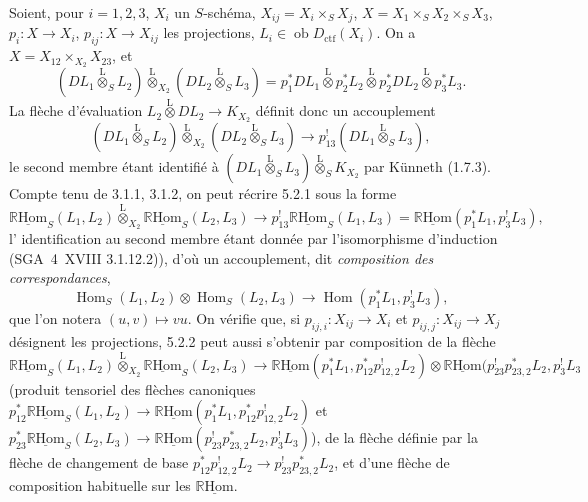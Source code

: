 \documentclass[11pt]{article}
\DeclareMathOperator{\Hom}{Hom}
\newcommand{\R}{\mathbb{R}}\newcommand{\RHomCore}{\mathbb{R}\mathrm{Hom}}
\providecommand{\RHom}{\RHomCore}
\providecommand{\uRHom}{\underline{\RHom}}
\providecommand{\RHom}{\RHomCore}
\providecommand{\Hom}{\operatorname{Hom}}
\providecommand{\RHom}{\R\mathcal{H}om}
\providecommand{\R}{\mathrm R}
\providecommand{\RHom}{\RHomCore}
\providecommand{\Hom}{\operatorname{Hom}}
\begin{document}
Soient, pour $i=1,2,3$, $X_i$ un $S$-schéma, $X_{ij}=X_i\times_SX_j$, $X=X_1\times_SX_2\times_SX_3$, $p_i:X\to X_i$, $p_{ij}:X\to X_{ij}$ les projections, $L_i\in\operatorname{ob}D_{\mathrm{ctf}}(X_i)$. On a $X=X_{12}\times_{X_2}X_{23}$, et
\[
(DL_1\overset{\mathrm{L}}{\otimes}_SL_2)\overset{\mathrm{L}}{\otimes}_{X_2}(DL_2\overset{\mathrm{L}}{\otimes}_SL_3)
=p_1^*DL_1\overset{\mathrm{L}}{\otimes}p_2^*L_2\overset{\mathrm{L}}{\otimes}p_2^*DL_2\overset{\mathrm{L}}{\otimes}p_3^*L_3.
\]
La flèche d'évaluation $L_2\overset{\mathrm{L}}{\otimes}DL_2\to K_{X_2}$ définit donc un accouplement
\begin{equation}
\tag{5.2.1}
(DL_1\overset{\mathrm{L}}{\otimes}_SL_2)\overset{\mathrm{L}}{\otimes}_{X_2}(DL_2\overset{\mathrm{L}}{\otimes}_SL_3)\longrightarrow p_{13}^!(DL_1\overset{\mathrm{L}}{\otimes}_SL_3),
\end{equation}
le second membre étant identifié à $(DL_1\overset{\mathrm{L}}{\otimes}_SL_3)\overset{\mathrm{L}}{\otimes}_SK_{X_2}$ par Künneth (1.7.3). Compte tenu de 3.1.1, 3.1.2, on peut récrire 5.2.1 sous la forme
\begin{equation}
\tag{5.2.2}
\uRHom_S(L_1,L_2)\overset{\mathrm{L}}{\otimes}_{X_2}\uRHom_S(L_2,L_3)\longrightarrow p_{13}^!\uRHom_S(L_1,L_3)=\uRHom(p_1^*L_1,p_3^!L_3),
\end{equation}
l'%
identification au second membre étant donnée par l'isomorphisme d'induction (SGA~4~XVIII 3.1.12.2)), d'où un accouplement, dit \emph{composition des correspondances},
\begin{equation}
\tag{5.2.3}
\Hom_S(L_1,L_2)\otimes\Hom_S(L_2,L_3)\longrightarrow\Hom(p_1^*L_1,p_3^!L_3),
\end{equation}
que l'on notera $(u,v)\mapsto vu$. On vérifie que, si $p_{ij,i}:X_{ij}\to X_i$ et $p_{ij,j}:X_{ij}\to X_j$ désignent les projections, 5.2.2 peut aussi s'obtenir par composition de la flèche
\[
\uRHom_S(L_1,L_2)\overset{\mathrm{L}}{\otimes}_{X_2}\uRHom_S(L_2,L_3)
\longrightarrow
\uRHom(p_1^*L_1,p_{12}^*p_{12,2}^!L_2)
\otimes
\uRHom(p_{23}^!p_{23,2}^*L_2,p_3^!L_3
\]
(produit tensoriel des flèches canoniques $p_{12}^*\uRHom_S(L_1,L_2)\to\uRHom(p_1^*L_1,p_{12}^*p_{12,2}^!L_2)$ et $p_{23}^*\uRHom_S(L_2,L_3)\to\uRHom(p_{23}^!p_{23,2}^*L_2,p_3^!L_3)$), de la flèche définie par la flèche de changement de base $p_{12}^*p_{12,2}^!L_2\to p_{23}^!p_{23,2}^*L_2$, et d'une flèche de composition habituelle sur les $\uRHom$.
\end{document}
